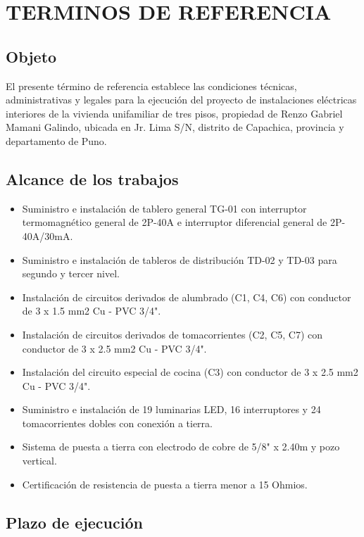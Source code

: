 \chapter{TERMINOS DE REFERENCIA}

\section{Objeto}

El presente término de referencia establece las condiciones técnicas, administrativas y legales para la ejecución del proyecto de instalaciones eléctricas interiores de la vivienda unifamiliar de tres pisos, propiedad de Renzo Gabriel Mamani Galindo, ubicada en Jr. Lima S/N, distrito de Capachica, provincia y departamento de Puno.

\section{Alcance de los trabajos}

\begin{itemize}
  \item Suministro e instalación de tablero general TG-01 con interruptor termomagnético general de 2P-40A e interruptor diferencial general de 2P-40A/30mA.
  \item Suministro e instalación de tableros de distribución TD-02 y TD-03 para segundo y tercer nivel.
  \item Instalación de circuitos derivados de alumbrado (C1, C4, C6) con conductor de 3 x 1.5 mm2 Cu - PVC 3/4".
  \item Instalación de circuitos derivados de tomacorrientes (C2, C5, C7) con conductor de 3 x 2.5 mm2 Cu - PVC 3/4".
  \item Instalación del circuito especial de cocina (C3) con conductor de 3 x 2.5 mm2 Cu - PVC 3/4".
  \item Suministro e instalación de 19 luminarias LED, 16 interruptores y 24 tomacorrientes dobles con conexión a tierra.
  \item Sistema de puesta a tierra con electrodo de cobre de 5/8" x 2.40m y pozo vertical.
  \item Certificación de resistencia de puesta a tierra menor a 15 Ohmios.
\end{itemize}

\section{Plazo de ejecución}

